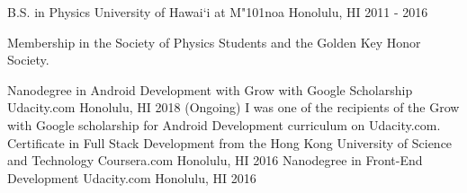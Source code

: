 \begin{cventries}
	\cventry
	{B.S. in Physics}
	{University of Hawai`i at M{\char"101}noa}
	{Honolulu, HI}
	{2011 - 2016}
	{
	  \begin{cvitems}
	    \item {Membership in the Society of Physics Students and the Golden Key Honor Society.}
	  \end{cvitems}
	}
	\cventry
	{Nanodegree in Android Development with Grow with Google Scholarship}
	{Udacity.com}
	{Honolulu, HI}
	{2018 (Ongoing)}
	{I was one of the recipients of the Grow with Google scholarship for Android Development curriculum on Udacity.com.}  
	\cventry
	{Certificate in Full Stack Development from the Hong Kong University of Science and Technology}
	{Coursera.com}
	{Honolulu, HI}
	{2016}
	{}  
	\cventry
	{Nanodegree in Front-End Development}
	{Udacity.com}
	{Honolulu, HI}
	{2016}
	{}    
\end{cventries}
